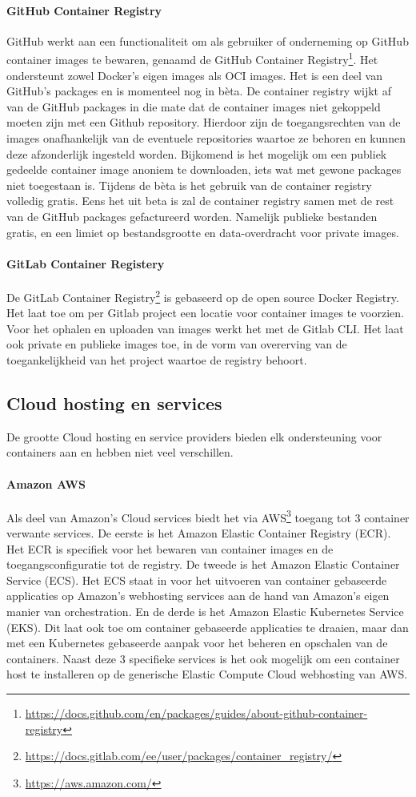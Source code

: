 \paragraph{GitHub Container Registry}
GitHub werkt aan een functionaliteit om als gebruiker of onderneming op GitHub container images te bewaren, genaamd de  GitHub Container Registry\footnote{\url{https://docs.github.com/en/packages/guides/about-github-container-registry}}. Het ondersteunt zowel Docker’s eigen images als OCI images. Het is een deel van GitHub’s packages en is momenteel nog in bèta. De container registry wijkt af van de GitHub packages in die mate dat de container images niet gekoppeld moeten zijn met een Github repository. Hierdoor zijn de toegangsrechten van de images onafhankelijk van de eventuele repositories waartoe ze behoren en kunnen deze afzonderlijk ingesteld worden. Bijkomend is het mogelijk om een publiek gedeelde container image anoniem te downloaden, iets wat met gewone packages niet toegestaan is. Tijdens de bèta is het gebruik van de container registry volledig gratis. Eens het uit beta is zal de container registry samen met de rest van de GitHub packages gefactureerd worden. Namelijk publieke bestanden gratis, en een limiet op bestandsgrootte en data-overdracht voor private images.
\paragraph{GitLab Container Registery}
De GitLab Container Registry\footnote{\url{https://docs.gitlab.com/ee/user/packages/container_registry/}} is gebaseerd op de open source Docker  Registry. Het laat toe om per Gitlab project een locatie voor container images te voorzien. Voor het ophalen en uploaden van images werkt het met de Gitlab CLI. Het laat ook private en publieke images toe, in de vorm van overerving van de toegankelijkheid van het project waartoe de registry behoort.

\subsection{Cloud hosting en services}
De grootte Cloud hosting en service providers bieden elk ondersteuning voor containers aan en hebben niet veel verschillen.
\paragraph{Amazon AWS}
Als deel van Amazon’s Cloud services biedt het via AWS\footnote{\url{https://aws.amazon.com/}} toegang tot 3 container verwante services. De eerste is het Amazon Elastic Container Registry (ECR). Het ECR is specifiek voor het bewaren van container images en de toegangsconfiguratie tot de registry. De tweede is het Amazon Elastic Container Service (ECS). Het ECS staat in voor het uitvoeren van container gebaseerde applicaties op Amazon’s webhosting services aan de hand van Amazon’s eigen manier van orchestration. En de derde is het Amazon Elastic Kubernetes Service (EKS). Dit laat ook toe om container gebaseerde applicaties te draaien, maar dan met een Kubernetes gebaseerde aanpak voor het beheren en opschalen van de containers. Naast deze 3 specifieke services is het ook mogelijk om een container host te installeren op de generische Elastic Compute Cloud webhosting van AWS.
